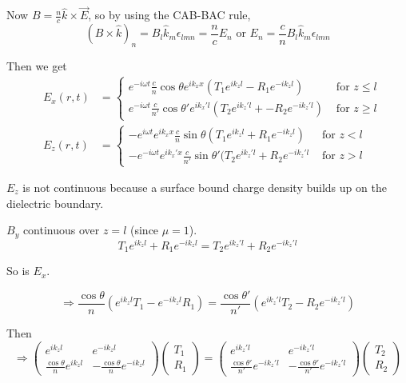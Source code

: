 \documentclass[twoside,10pt]{amsart}
\begin{document}
Now $B = \frac{n}{c} \hat{k} \times \vec{E}$, so by using the CAB-BAC rule, 
\[
(B \times \hat{k} )_n = B_l \hat{k}_m \epsilon_{lmn} = \frac{n}{c} E_n \text{ or } E_n = \frac{c}{n} B_l \hat{k}_m \epsilon_{lmn}
\]

Then we get
\[
\begin{aligned}
  & E_x(r,t) & = \begin{cases} e^{-i \omega t} \frac{c}{n} \cos{\theta} e^{i k_x x} ( T_1 e^{ik_z l} - R_1 e^{-i k_zl } ) & \text{ for } z \leq l \\ e^{-i \omega t} \frac{c}{n'} \cos{\theta'} e^{ik_x' l} (T_2 e^{ik_z'l} + - R_2 e^{ -ik_z' l} ) & \text{ for } z \geq l \end{cases} \\
  & E_z(r,t) & = \begin{cases} -e^{i \omega t } e^{ik_x x} \frac{c}{n} \sin{\theta} ( T_1 e^{i k_z l } +R_1 e^{ -ik_z l} ) & \text{ for } z < l \\ 
    -e^{-i \omega t} e^{ik_x' x} \frac{c}{n'} \sin{\theta' } (T_2 e^{ik_z' l} + R_2 e^{-ik_z' l} & \text{ for } z > l \end{cases} 
\end{aligned}
\]

$E_z$ is not continuous because a surface bound charge density builds up on the dielectric boundary.  

$B_y$ continuous over $z=l$ (since $\mu =1$). 
\[
T_1 e^{ i k_z l } + R_1 e^{ - ik_z l} = T_2 e^{ i k_z' l} + R_2 e^{-i k_z' l}
\]

So is $E_x$.  

\[
\Longrightarrow  \frac{\cos{\theta}}{n} (e^{i k_z l }T_{1} - e^{ -ik_z l} R_{1} ) = \frac{ \cos{\theta'}}{n'} ( e^{ i k_z' l} T_2 - R_2 e^{ -i k_z' l } )
\]

Then
\[
\Longrightarrow \left( \begin{matrix} e^{ik_zl} & e^{-ik_zl} \\ \frac{ \cos{\theta}}{n}  e^{ik_z l} & - \frac{ \cos{\theta} }{n} e^{-ik_z l } \end{matrix} \right) \left( \begin{matrix} T_{1} \\ R_{1} \end{matrix} \right) = \left( \begin{matrix} e^{ i k_z' l } & e^{ -i k_z' l } \\ \frac{ \cos{\theta'}}{n'} e^{ -i k_z' l} & - \frac{ \cos{\theta'}}{n'} e^{ -i k_z' l } \end{matrix} \right) \left( \begin{matrix} T_{2} \\ R_{2} \end{matrix} \right)
\]
\end{document}
